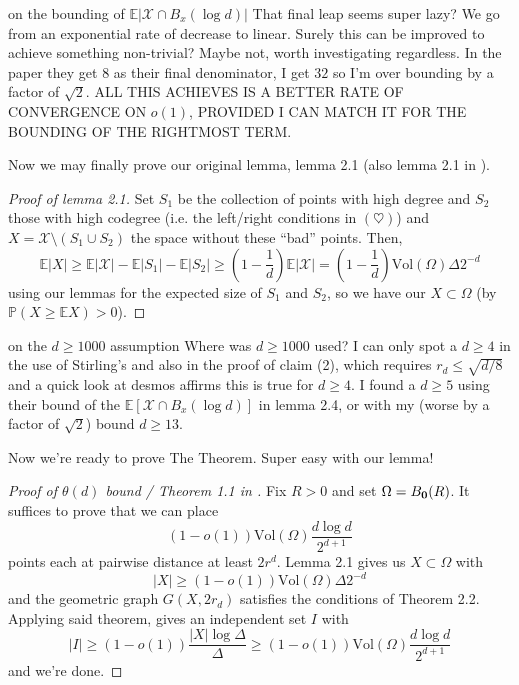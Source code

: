 \documentclass{article}
\begin{document}
\begin{remark}[]{on the bounding of $\mathbb{E}|\mathcal{X} \cap B_x(\log d)|$}
    That final leap seems super lazy? We go from an exponential rate of decrease to linear. Surely this can be 
    improved to achieve something non-trivial? Maybe not, worth investigating regardless. In the paper they get 
    $8$ as their final denominator, I get $32$ so I'm over bounding by a factor of $\sqrt{2}$. ALL THIS ACHIEVES
    IS A BETTER RATE OF CONVERGENCE ON $o(1)$, PROVIDED I CAN MATCH IT FOR THE BOUNDING OF THE RIGHTMOST TERM.
\end{remark}

Now we may finally prove our original lemma, lemma 2.1 (also lemma 2.1 in \cite{campos2023}). 

\begin{proof}[Proof of lemma 2.1]
    Set $S_1$ be the collection of points with high degree and $S_2$ those with high codegree (i.e. the left/right 
    conditions in $(\heartsuit)$) and $X = \mathcal{X} \setminus (S_1 \cup S_2)$ the space without these ``bad'' points.
    Then,
    \[\mathbb{E}|X| \geq \mathbb{E}|\mathcal{X}| - \mathbb{E}|S_1| - \mathbb{E}|S_2| 
    \geq \left(1 - \frac{1}{d}\right)\mathbb{E}|\mathcal{X}| = \left(1 - \frac{1}{d}\right)\text{Vol}(\Omega)\Delta 2^{-d}\]
    using our lemmas for the expected size of $S_1$ and $S_2$, so we have our $X \subset \Omega$ (by $\mathbb{P}(X \geq \mathbb{E}X) > 0$).
\end{proof}

\begin{remark}[]{on the $d \geq 1000$ assumption}
    Where was $d \geq 1000$ used? I can only spot a $d \geq 4$ in the use of Stirling's and also in the proof 
    of claim (2), which requires $r_d \leq \sqrt{d/8}$ and a quick look at desmos affirms this is true for 
    $d \geq 4$. I found a $d \geq 5$ using their bound of the $\mathbb{E}[\mathcal{X} \cap B_x(\log d)]$ in 
    lemma 2.4, or with my (worse by a factor of $\sqrt{2}$) bound $d \geq 13$. 
\end{remark}

Now we're ready to prove The Theorem\texttrademark. Super easy with our lemma!

\begin{proof}[Proof of $\theta(d)$ bound / Theorem 1.1 in \cite{campos2023}]
    Fix $R > 0$ and set $\Omega = B_{{\bf 0}}(R)$. It suffices to prove that we can place \[(1 - o(1))\text{Vol}(\Omega)
    \frac{d\log d}{2^{d+1}}\] points each at pairwise distance at least $2r^d$. Lemma 2.1 
    gives us $X \subset \Omega$ with \[|X| \geq (1-o(1))\text{Vol}(\Omega)\Delta 2^{-d}\] and the geometric graph 
    $G(X, 2r_d)$ satisfies the conditions of Theorem 2.2. Applying said theorem, gives an independent set $I$ with 
    \[|I| \geq (1-o(1)) \frac{|X|\log \Delta}{\Delta} \geq (1-o(1))\text{Vol}(\Omega)\frac{d\log d}{2^{d+1}}\] and we're done.
\end{proof}
\end{document}
